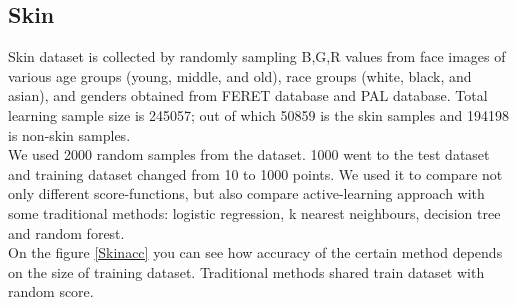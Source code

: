 \documentclass[a4paper]{article}
\begin{document}
\clearpage
\subsection{Skin}

Skin dataset  is collected by randomly sampling B,G,R values from face images of various age groups (young, middle, and old), race groups (white, black, and asian), and genders obtained from FERET database and PAL database. Total learning sample size is 245057; out of which 50859 is the skin samples and 194198 is non-skin samples. 
\\
We used 2000 random samples from the dataset. 1000 went to the test dataset and training dataset changed from 10 to 1000 points. We used it to compare not only different score-functions, but also compare active-learning approach with some traditional methods: logistic regression, k nearest neighbours, decision tree and random forest.
\\
On the figure \ref{Skinacc} you can see how accuracy of the certain method depends on the size of training dataset. Traditional methods shared train dataset with random score.
\end{document}
